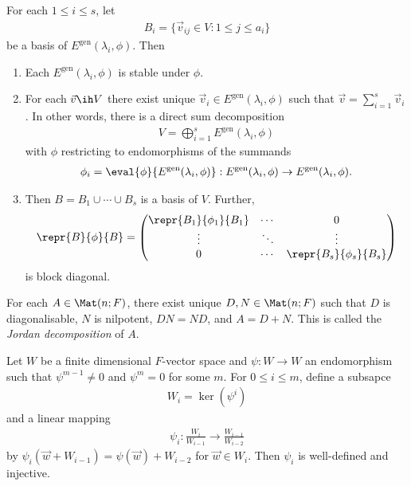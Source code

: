 \documentclass{article}
\begin{document}
\begin{proposition}[Proposition 6.3.5]
	For each $1\leq i\leq s$, let
	\begin{align*}
		B_i=\{\vec v_{ij}\in V : 1\leq j\leq a_i\}
	\end{align*}
	be a basis of $E^\text{gen}(\lambda_i,\phi)$. Then
	\begin{enumerate}
		\item Each $E^\text{gen}(\lambda_i,\phi)$ is stable under $\phi$.
		\item For each $\vec v\ih V$ there exist unique $\vec v_i\in E^\text{gen}(\lambda_i,\phi)$
		      such that $\vec v = \sum_{i=1}^s \vec v_i$. In other words, there is a direct sum decomposition
		      \begin{align*}
			      V = \bigoplus_{i=1}^s E^\text{gen}(\lambda_i,\phi)
		      \end{align*}
		      with $\phi$ restricting to endomorphisms of the summands \begin{align*}
			      \phi_i = \eval{\phi}{E^\text{gen}(\lambda_i,\phi)}:E^\text{gen}(\lambda_i,\phi)\to E^\text{gen}(\lambda_i,\phi).
		      \end{align*}
		\item Then $B=B_1\cup\cdots\cup B_s$ is a basis of $V$. Further, \begin{align*}
			      \repr{B}{\phi}{B}=\begin{pmatrix}
				      \repr{B_1}{\phi_1}{B_1} & \cdots & 0                       \\
				      \vdots                  & \ddots & \vdots                  \\
				      0                       & \cdots & \repr{B_s}{\phi_s}{B_s}
			      \end{pmatrix}
		      \end{align*}
		      is block diagonal.
	\end{enumerate}
\end{proposition}

\begin{corollary}
	For each $A\in\Mat(n; F)$, there exist unique $D,N\in\Mat(n; F)$ such that $D$ is diagonalisable,
	$N$ is nilpotent, $DN=ND$, and $A=D+N$. This is called the \emph{Jordan decomposition} of $A$.
\end{corollary}

\begin{lemma}[Lemma 6.3.6]
	Let $W$ be a finite dimensional $F$-vector space and $\psi:W\to W$ an endomorphism such that
	$\psi^{m-1}\neq 0$ and $\psi^m=0$ for some $m$. For $0\leq i\leq m$, define a subsapce
	\begin{align*}
		W_i=\ker(\psi^i)
	\end{align*}
	and a linear mapping
	\begin{align*}
		\psi_i:\frac{W_i}{W_{i-1}}\to \frac{W_{i-1}}{W_{i-2}}
	\end{align*}
	by $\psi_i(\vec w+W_{i-1})=\psi(\vec w)+W_{i-2}$ for $\vec w\in W_i$. Then $\psi_i$ is well-defined
	and injective.
\end{lemma}
\end{document}
